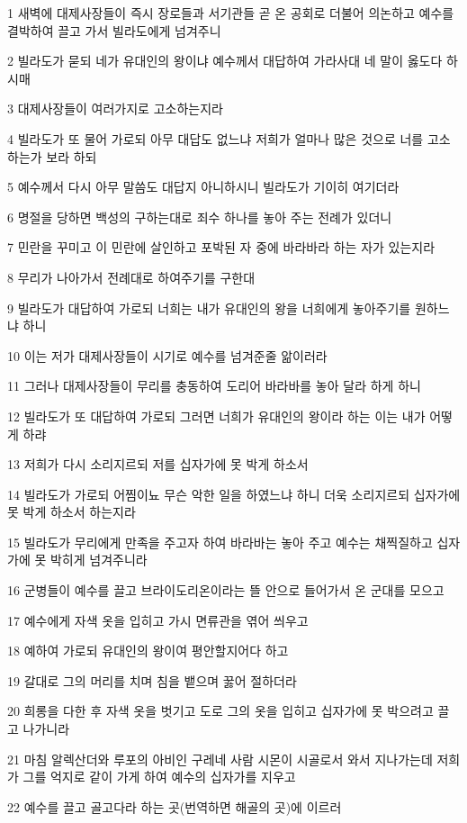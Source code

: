 \par 1 새벽에 대제사장들이 즉시 장로들과 서기관들 곧 온 공회로 더불어 의논하고 예수를 결박하여 끌고 가서 빌라도에게 넘겨주니
\par 2 빌라도가 묻되 네가 유대인의 왕이냐 예수께서 대답하여 가라사대 네 말이 옳도다 하시매
\par 3 대제사장들이 여러가지로 고소하는지라
\par 4 빌라도가 또 물어 가로되 아무 대답도 없느냐 저희가 얼마나 많은 것으로 너를 고소하는가 보라 하되
\par 5 예수께서 다시 아무 말씀도 대답지 아니하시니 빌라도가 기이히 여기더라
\par 6 명절을 당하면 백성의 구하는대로 죄수 하나를 놓아 주는 전례가 있더니
\par 7 민란을 꾸미고 이 민란에 살인하고 포박된 자 중에 바라바라 하는 자가 있는지라
\par 8 무리가 나아가서 전례대로 하여주기를 구한대
\par 9 빌라도가 대답하여 가로되 너희는 내가 유대인의 왕을 너희에게 놓아주기를 원하느냐 하니
\par 10 이는 저가 대제사장들이 시기로 예수를 넘겨준줄 앎이러라
\par 11 그러나 대제사장들이 무리를 충동하여 도리어 바라바를 놓아 달라 하게 하니
\par 12 빌라도가 또 대답하여 가로되 그러면 너희가 유대인의 왕이라 하는 이는 내가 어떻게 하랴
\par 13 저희가 다시 소리지르되 저를 십자가에 못 박게 하소서
\par 14 빌라도가 가로되 어찜이뇨 무슨 악한 일을 하였느냐 하니 더욱 소리지르되 십자가에 못 박게 하소서 하는지라
\par 15 빌라도가 무리에게 만족을 주고자 하여 바라바는 놓아 주고 예수는 채찍질하고 십자가에 못 박히게 넘겨주니라
\par 16 군병들이 예수를 끌고 브라이도리온이라는 뜰 안으로 들어가서 온 군대를 모으고
\par 17 예수에게 자색 옷을 입히고 가시 면류관을 엮어 씌우고
\par 18 예하여 가로되 유대인의 왕이여 평안할지어다 하고
\par 19 갈대로 그의 머리를 치며 침을 뱉으며 꿇어 절하더라
\par 20 희롱을 다한 후 자색 옷을 벗기고 도로 그의 옷을 입히고 십자가에 못 박으려고 끌고 나가니라
\par 21 마침 알렉산더와 루포의 아비인 구레네 사람 시몬이 시골로서 와서 지나가는데 저희가 그를 억지로 같이 가게 하여 예수의 십자가를 지우고
\par 22 예수를 끌고 골고다라 하는 곳(번역하면 해골의 곳)에 이르러
